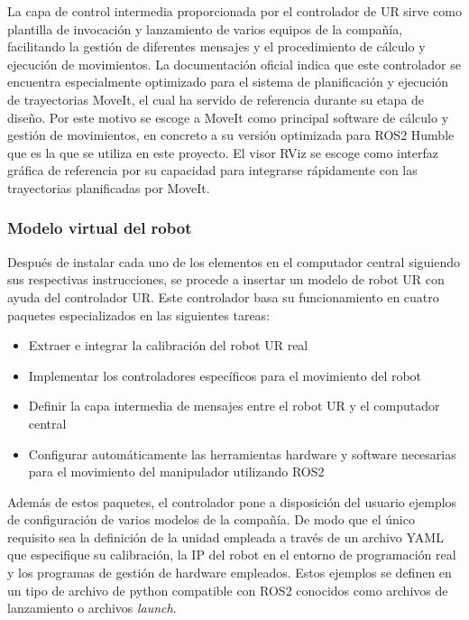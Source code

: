 La capa de control intermedia proporcionada por el controlador de UR sirve como plantilla de invocación y lanzamiento de varios equipos de la compañía, facilitando la gestión de diferentes mensajes y el procedimiento de cálculo y ejecución de movimientos. La documentación oficial indica que este controlador se encuentra especialmente optimizado para el sistema de planificación y ejecución de trayectorias MoveIt, el cual ha servido de referencia durante su etapa de diseño. Por este motivo se escoge a MoveIt como principal software de cálculo y gestión de movimientos, en concreto a su versión optimizada para ROS2 Humble que es la que se utiliza en este proyecto. El visor RViz se escoge como interfaz gráfica de referencia por su capacidad para integrarse rápidamente con las trayectorias planificadas por MoveIt.

\subsubsection*{Modelo virtual del robot}
\hypertarget{Modelo virtual del robot}{}
\label{sec: modelo virtual del robot}

Después de instalar cada uno de los elementos en el computador central siguiendo sus respectivas instrucciones, se procede a insertar un modelo de robot UR con ayuda del controlador UR. Este controlador basa su funcionamiento en cuatro paquetes especializados en las siguientes tareas:
\begin{itemize}
    \item Extraer e integrar la calibración del robot UR real
    \item Implementar los controladores específicos para el movimiento del robot
    \item Definir la capa intermedia de mensajes entre el robot UR y el computador central
    \item Configurar automáticamente las herramientas hardware y software necesarias para el movimiento del manipulador utilizando ROS2
\end{itemize}

Además de estos paquetes, el controlador pone a disposición del usuario ejemplos de configuración de varios modelos de la compañía. De modo que el único requisito sea la definición de la unidad empleada a través de un archivo \acrshort{YAML} que especifique su calibración, la IP del robot en el entorno de programación real y los programas de gestión de hardware empleados. Estos ejemplos se definen en un tipo de archivo de python compatible con ROS2 conocidos como archivos de lanzamiento o archivos \textit{launch}.

